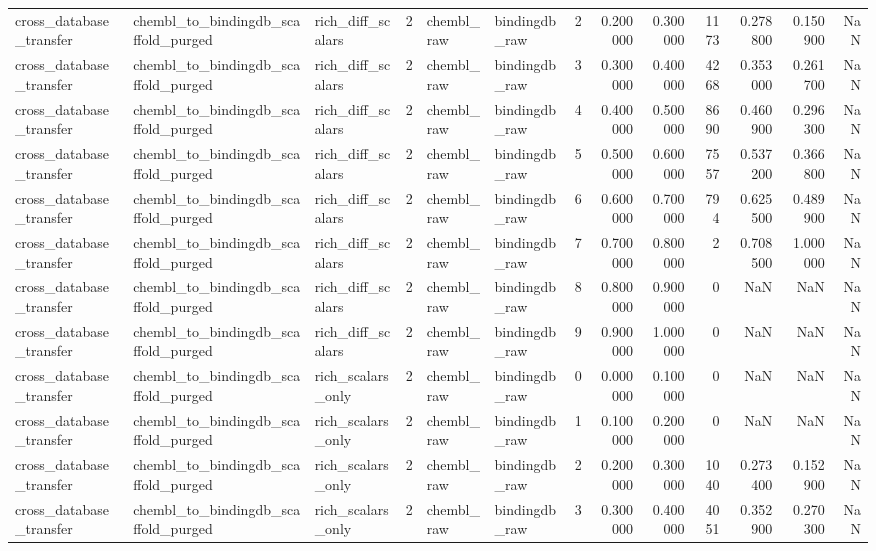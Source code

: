\begin{longtable}{lllrllrrrrrrr}
cross\_database\_transfer & chembl\_to\_bindingdb\_scaffold\_purged & rich\_diff\_scalars & 2 & chembl\_raw & bindingdb\_raw & 2 & 0.200000 & 0.300000 & 1173 & 0.278800 & 0.150900 & NaN \\
cross\_database\_transfer & chembl\_to\_bindingdb\_scaffold\_purged & rich\_diff\_scalars & 2 & chembl\_raw & bindingdb\_raw & 3 & 0.300000 & 0.400000 & 4268 & 0.353000 & 0.261700 & NaN \\
cross\_database\_transfer & chembl\_to\_bindingdb\_scaffold\_purged & rich\_diff\_scalars & 2 & chembl\_raw & bindingdb\_raw & 4 & 0.400000 & 0.500000 & 8690 & 0.460900 & 0.296300 & NaN \\
cross\_database\_transfer & chembl\_to\_bindingdb\_scaffold\_purged & rich\_diff\_scalars & 2 & chembl\_raw & bindingdb\_raw & 5 & 0.500000 & 0.600000 & 7557 & 0.537200 & 0.366800 & NaN \\
cross\_database\_transfer & chembl\_to\_bindingdb\_scaffold\_purged & rich\_diff\_scalars & 2 & chembl\_raw & bindingdb\_raw & 6 & 0.600000 & 0.700000 & 794 & 0.625500 & 0.489900 & NaN \\
cross\_database\_transfer & chembl\_to\_bindingdb\_scaffold\_purged & rich\_diff\_scalars & 2 & chembl\_raw & bindingdb\_raw & 7 & 0.700000 & 0.800000 & 2 & 0.708500 & 1.000000 & NaN \\
cross\_database\_transfer & chembl\_to\_bindingdb\_scaffold\_purged & rich\_diff\_scalars & 2 & chembl\_raw & bindingdb\_raw & 8 & 0.800000 & 0.900000 & 0 & NaN & NaN & NaN \\
cross\_database\_transfer & chembl\_to\_bindingdb\_scaffold\_purged & rich\_diff\_scalars & 2 & chembl\_raw & bindingdb\_raw & 9 & 0.900000 & 1.000000 & 0 & NaN & NaN & NaN \\
cross\_database\_transfer & chembl\_to\_bindingdb\_scaffold\_purged & rich\_scalars\_only & 2 & chembl\_raw & bindingdb\_raw & 0 & 0.000000 & 0.100000 & 0 & NaN & NaN & NaN \\
cross\_database\_transfer & chembl\_to\_bindingdb\_scaffold\_purged & rich\_scalars\_only & 2 & chembl\_raw & bindingdb\_raw & 1 & 0.100000 & 0.200000 & 0 & NaN & NaN & NaN \\
cross\_database\_transfer & chembl\_to\_bindingdb\_scaffold\_purged & rich\_scalars\_only & 2 & chembl\_raw & bindingdb\_raw & 2 & 0.200000 & 0.300000 & 1040 & 0.273400 & 0.152900 & NaN \\
cross\_database\_transfer & chembl\_to\_bindingdb\_scaffold\_purged & rich\_scalars\_only & 2 & chembl\_raw & bindingdb\_raw & 3 & 0.300000 & 0.400000 & 4051 & 0.352900 & 0.270300 & NaN \\

\end{longtable}
